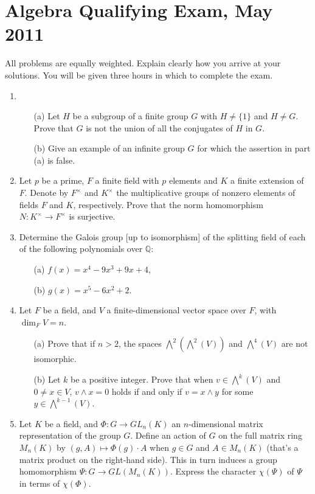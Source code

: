 \documentclass{article}
\begin{document}
\section*{Algebra Qualifying Exam, May 2011}

All problems are equally weighted. Explain clearly how you arrive at your solutions. You will be given three hours in which to complete the exam.

\begin{enumerate}
    \item 
    \begin{itemize}
        \item[(a)] Let \(H\) be a subgroup of a finite group \(G\) with \(H\neq\{1\}\) and \(H\neq G\). Prove that \(G\) is not the union of all the conjugates of \(H\) in \(G\).
        \item[(b)] Give an example of an infinite group \(G\) for which the assertion in part (a) is false.
    \end{itemize}

    \item Let \(p\) be a prime, \(F\) a finite field with \(p\) elements and \(K\) a finite extension of \(F\). Denote by \(F^\times\) and \(K^\times\) the multiplicative groups of nonzero elements of fields \(F\) and \(K\), respectively. Prove that the norm homomorphism \(N:K^\times\to F^\times\) is surjective.

    \item Determine the Galois group [up to isomorphism] of the splitting field of each of the following polynomials over \(\mathbb{Q}\):
    \begin{itemize}
        \item[(a)] \(f(x)=x^4-9x^3+9x+4\),
        \item[(b)] \(g(x)=x^5-6x^2+2\).
    \end{itemize}

    \item Let \(F\) be a field, and \(V\) a finite-dimensional vector space over \(F\), with \(\dim_F V=n\).
    \begin{itemize}
        \item[(a)] Prove that if \(n>2\), the spaces \(\bigwedge^2(\bigwedge^2(V))\) and \(\bigwedge^4(V)\) are not isomorphic.
        \item[(b)] Let \(k\) be a positive integer. Prove that when \(v\in\bigwedge^k(V)\) and \(0\neq x\in V\), \(v\wedge x=0\) holds if and only if \(v=x\wedge y\) for some \(y\in\bigwedge^{k-1}(V)\).
    \end{itemize}

    \item Let \(K\) be a field, and \(\Phi:G\to GL_n(K)\) an \(n\)-dimensional matrix representation of the group \(G\). Define an action of \(G\) on the full matrix ring \(M_n(K)\) by \((g,A)\mapsto\Phi(g)\cdot A\) when \(g\in G\) and \(A\in M_n(K)\) (that's a matrix product on the right-hand side). This in turn induces a group homomorphism \(\Psi:G\to GL(M_n(K))\). Express the character \(\chi(\Psi)\) of \(\Psi\) in terms of \(\chi(\Phi)\).
\end{enumerate}
\end{document}
